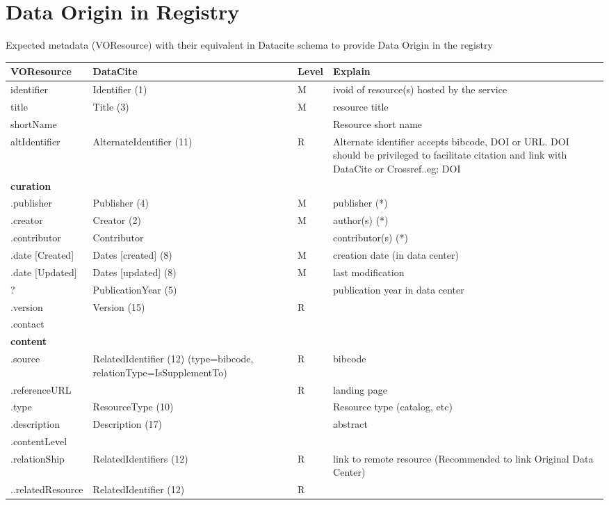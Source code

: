 \documentclass[11pt,a4paper]{ivoa}
\begin{document}
\section{Data Origin in Registry}

Expected metadata (VOResource) with their equivalent in Datacite schema to provide Data Origin in the registry

\begin{tabular}{|l|p{5cm}|l|p{5cm}|} \hline
\textbf{VOResource} & \textbf{DataCite} & \textbf{Level} & \textbf{Explain} \\ \hline
identifier    &Identifier (1) &M & ivoid of resource(s) hosted by the service\\ \hline
title         &Title (3) &M  & resource title\\ \hline
shortName     &&& Resource short name\\ \hline
altIdentifier & AlternateIdentifier (11)& R & 
              Alternate identifier accepts bibcode, DOI or URL. DOI should be privileged to facilitate citation and link with DataCite or Crossref..eg: DOI \\ \hline

\multicolumn{4}{|l|}{\textbf{curation}} \\ \hline
.publisher     & Publisher (4) & M &publisher (*)\\ \hline
.creator       & Creator (2) & M & author(s) (*)\\ \hline
.contributor   & Contributor & & contributor(s) (*)\\ \hline
.date [Created]& Dates [created] (8)& M & creation date (in data center)\\ \hline
.date [Updated]& Dates [updated] (8)& M & last modification\\ \hline
  ?            & PublicationYear (5) & & publication year in data center\\ \hline
.version       & Version (15) & R &\\ \hline
.contact       & &&\\ \hline

\multicolumn{4}{|l|}{\textbf{content} } \\ \hline
.source        & RelatedIdentifier (12) (type=bibcode, relationType=IsSupplementTo) & R & bibcode\\ \hline
.referenceURL  & & R & landing page\\ \hline
.type          & ResourceType (10)& & Resource type (catalog, etc)\\ \hline
.description   & Description (17)& & abstract\\ \hline
.contentLevel  & & &\\ \hline
.relationShip  & RelatedIdentifiers (12) & R &link to remote resource (Recommended to link Original Data Center) \\ \hline
..relatedResource & RelatedIdentifier (12) & R &\\ \hline


\end{tabular}
\end{document}
